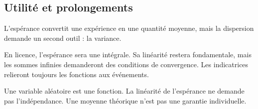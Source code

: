 \documentclass[../cours_1re.tex]{subfiles}
\begin{document}
\begin{finchapitre}
\section{Utilité et prolongements}
L'espérance convertit une expérience en une quantité moyenne, mais la
dispersion demande un second outil : la variance.

En licence, l'espérance sera une intégrale. Sa linéarité restera fondamentale,
mais les sommes infinies demanderont des conditions de convergence.
Les indicatrices relieront toujours les fonctions aux événements.
\begin{retenir}
Une variable aléatoire est une fonction. La linéarité de l'espérance ne
demande pas l'indépendance. Une moyenne théorique n'est pas une garantie individuelle.
\end{retenir}
\end{finchapitre}
\end{document}
